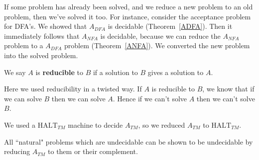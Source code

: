 \vskip0.15in
If some problem has already been solved, and we reduce a new problem to an old problem, then we've solved it too. For instance, consider the acceptance problem for DFA's. We showed that $A_{DFA}$ is decidable (Theorem~\ref{ADFA}). Then it immediately follows that $A_{NFA}$ is decidable, because we can reduce the $A_{NFA}$ problem to a $A_{DFA}$ problem (Theorem~\ref{ANFA}). We converted the new problem into the solved problem.

\begin{df}
We say $A$ is \textbf{reducible} to $B$ if a solution to $B$ gives a solution to $A$.
\end{df}
Here we used reducibility in a twisted way. If $A$ is reducible to $B$, we know that if we can solve $B$ then we can solve $A$. Hence if we can't solve $A$ then we can't solve $B$.


We used a $\text{HALT}_{TM}$ machine to decide $A_{TM}$, so we reduced $A_{TM}$ to $\text{HALT}_{TM}$.

All ``natural" problems which are undecidable can be shown to be undecidable by reducing $A_{TM}$ to them or their complement.\\


\vskip0.15in

